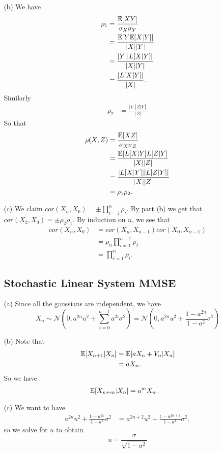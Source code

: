 (b) We have
\begin{align*}
    \rho_1 &= \frac{\mathbb{E}[XY]}{\sigma_X\sigma_Y} \\
        &= \frac{\mathbb{E}[Y\mathbb{E}[X|Y]]}{|X||Y|} \\
        &= \frac{|Y||L[X|Y]|}{|X||Y|} \\
        &= \frac{|L[X|Y]|}{|X|}.
\end{align*}
Similarly
\begin{align*}
    \rho_2 &= \frac{|L[Z|Y]}{|Z|}
\end{align*}
So that 
\begin{align*}
    \rho(X, Z) &= \frac{\mathbb{E}[XZ]}{\sigma_X\sigma_Z} \\
        &= \frac{\mathbb{E}[L[X|Y]L[Z|Y]}{|X||Z|} \\
        &= \frac{|L[X|Y]||L[Z|Y]|}{|X||Z|} \\
        &= \rho_1\rho_2.
\end{align*}

(c) We claim $cor(X_n, X_0) = \pm\prod_{i = 1}^n\rho_i$. By part (b) we get that $cor(X_2, X_0) = \pm\rho_2\rho_1$. By induction on $n$, we see that
\begin{align*}
    cor(X_n, X_0) &= cor(X_n, X_{n-1})cor(X_0, X_{n-1}) \\
        &= \rho_n\prod_{i=1}^{n-1}\rho_i \\
        &= \prod_{i = 1}^n\rho_i.
\end{align*}


\subsection{Stochastic Linear System MMSE}
(a) Since all the gaussians are independent, we have
\[
X_n \sim \mathcal{N}\left(0, a^{2n}u^2 + \sum_{i = 0}^{n - 1}a^{2i}\sigma^2\right) = \mathcal{N}\left(0, a^{2n}u^2 + \frac{1 - a^{2n}}{1 - a^2}\sigma^2\right)
\]


(b) Note that
\begin{align*}
    \mathbb{E}[X_{n+1} | X_n] &= \mathbb{E}[aX_n + V_n | X_n] \\
        &= aX_n.
\end{align*}
So we have
\begin{align*}
    \mathbb{E}[X_{n + m}|X_n] &= a^mX_n.
\end{align*}


(c) We want to have
\begin{align*}
    a^{2n}u^2 + \frac{1 - a^{2n}}{1 - a^2}\sigma^2 &= a^{2n + 2}u^2 + \frac{1 - a^{2n + 2}}{1 - a^2}\sigma^2,
\end{align*}
so we solve for $u$ to obtain
\[
u = \frac{\sigma}{\sqrt{1 - a^2}}
\]


